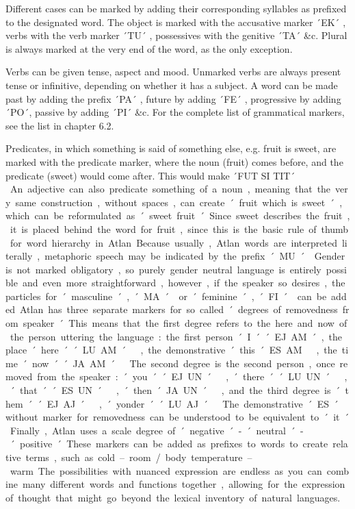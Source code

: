 Different cases can be marked by adding their corresponding syllables as prefixed to the designated word. The object is marked with the accusative marker ´EK´ \ek, verbs with the verb marker ´TU´ \tu, possessives with the genitive ´TA´ \ta \&c. Plural is always marked at the very end of the word, as the only exception. 

Verbs can be given tense, aspect and mood. Unmarked verbs are always present tense or infinitive, depending on whether it has a subject. A word can be made past by adding the prefix ´PA´ \pa, future by adding ´FE´ \fe, progressive by adding ´PO´, passive by adding ´PI´ \&c. For the complete list of grammatical markers, see the list in chapter 6.2. 

Predicates, in which something is said of something else, e.g. fruit is sweet, are marked with the predicate marker, where the noun (fruit) comes before, and the predicate (sweet) would come after. This would make ´FUT SI TIT´ \fut  \si  \tit. An adjective can also predicate something of a noun, meaning that the very same construction, without spaces, can create ´fruit which is sweet´, which can be reformulated as ´sweet fruit´. Since sweet describes the fruit, it is placed behind the word for fruit, since this is the basic rule of thumb for word hierarchy in Atlan. 

Because usually, Atlan words are interpreted literally, metaphoric speech may be indicated by the prefix ´MU´ \Atlanmu. 

Gender is not marked obligatory, so purely gender neutral language is entirely possible and even more straightforward, however, if the speaker so desires, the particles for ´masculine´, ´MA´ \ma or ´feminine´, ´FI´ \Atlanfi can be added. 

Atlan has three separate markers for so called ´degrees of removedness from speaker´. This means that the first degree refers to the here and now of the person uttering the language: the first person ´I´ ´EJ.AM´, the place ´here´ ´LU.AM´ \lu \am, the demonstrative ´this´ ES.AM \es \am, the time ´now´ ´JA.AM´ \ja \am. The second degree is the second person, once removed from the speaker: ´you´ ´EJ.UN´ \ej \un, ´there´ ´LU.UN´ \lu \un, ´that´ ´ES.UN´ \es \un, ´then´ JA.UN´ \ja \un, and the third degree is ´them´ ´EJ.AJ´ \ej \aj, ´yonder´ ´LU.AJ´ \lu \aj. The demonstrative ´ES´ \es without marker for removedness can be understood to be equivalent to ´it´.  

Finally, Atlan uses a scale degree of ´negative´ - ´neutral´ - ´positive´. These markers can be added as prefixes to words to create relative terms, such as cold – room / body temperature – warm. The possibilities with nuanced expression are endless as you can combine many different words and functions together, allowing for the expression of thought that might go beyond the lexical inventory of natural languages. 

